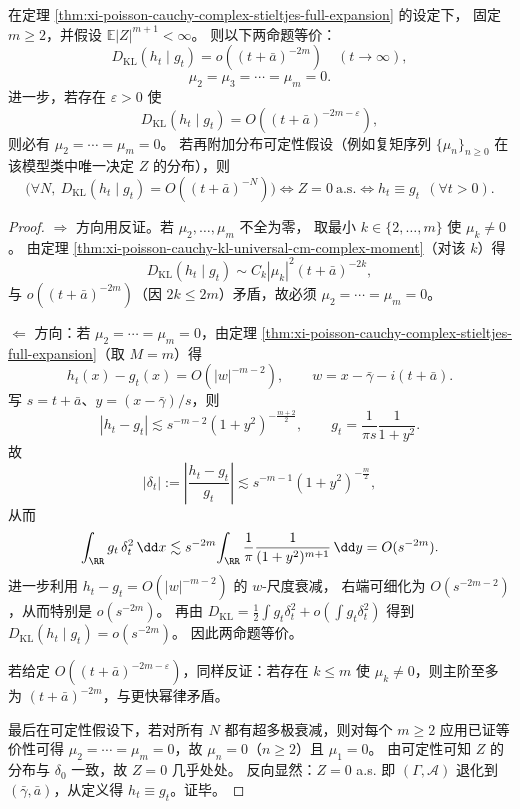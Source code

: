 \begin{theorem}[超多极衰减的分层刚性]\label{thm:xi-poisson-cauchy-supermultipole-hierarchy-rigidity}
在定理 \ref{thm:xi-poisson-cauchy-complex-stieltjes-full-expansion} 的设定下，
固定 \(m\ge 2\)，并假设 \(\mathbb E|Z|^{m+1}<\infty\)。
则以下两命题等价：
\[
D_{\mathrm{KL}}(h_t\mid g_t)=o((t+\bar a)^{-2m})\quad(t\to\infty),
\]
\[
\mu_2=\mu_3=\cdots=\mu_m=0.
\]
进一步，若存在 \(\varepsilon>0\) 使
\[
D_{\mathrm{KL}}(h_t\mid g_t)=O((t+\bar a)^{-2m-\varepsilon}),
\]
则必有 \(\mu_2=\cdots=\mu_m=0\)。
若再附加分布可定性假设（例如复矩序列 \(\{\mu_n\}_{n\ge0}\) 在该模型类中唯一决定 \(Z\) 的分布），则
\[
\bigl(\forall N,\ D_{\mathrm{KL}}(h_t\mid g_t)=O((t+\bar a)^{-N})\bigr)
\iff Z=0\ \text{a.s.}
\iff h_t\equiv g_t\ \ (\forall t>0).
\]
\end{theorem}
\begin{proof}
\(\Rightarrow\) 方向用反证。若 \(\mu_2,\dots,\mu_m\) 不全为零，
取最小 \(k\in\{2,\dots,m\}\) 使 \(\mu_k\neq 0\)。
由定理 \ref{thm:xi-poisson-cauchy-kl-universal-cm-complex-moment}（对该 \(k\)）得
\[
D_{\mathrm{KL}}(h_t\mid g_t)\sim C_k|\mu_k|^2(t+\bar a)^{-2k},
\]
与 \(o((t+\bar a)^{-2m})\)（因 \(2k\le 2m\)）矛盾，故必须 \(\mu_2=\cdots=\mu_m=0\)。
\par
\(\Leftarrow\) 方向：若 \(\mu_2=\cdots=\mu_m=0\)，由定理
\ref{thm:xi-poisson-cauchy-complex-stieltjes-full-expansion}（取 \(M=m\)）得
\[
h_t(x)-g_t(x)=O\!\left(|w|^{-m-2}\right),
\qquad
w=x-\bar\gamma-i(t+\bar a).
\]
写 \(s=t+\bar a\)、\(y=(x-\bar\gamma)/s\)，则
\[
|h_t-g_t|
\lesssim s^{-m-2}(1+y^2)^{-\frac{m+2}{2}},\qquad
g_t=\frac{1}{\pi s}\frac{1}{1+y^2}.
\]
故
\[
|\delta_t|:=\left|\frac{h_t-g_t}{g_t}\right|
\lesssim s^{-m-1}(1+y^2)^{-\frac m2},
\]
从而
\[
\int_{\RR}g_t\,\delta_t^2\,\dd x
\lesssim s^{-2m}\!\int_{\RR}\frac{1}{\pi}\frac{1}{(1+y^2)^{m+1}}\,\dd y
=O(s^{-2m}).
\]
进一步利用 \(h_t-g_t=O(|w|^{-m-2})\) 的 \(w\)-尺度衰减，
右端可细化为 \(O(s^{-2m-2})\)，从而特别是 \(o(s^{-2m})\)。
再由
\(
D_{\mathrm{KL}}=\frac12\int g_t\delta_t^2+o(\int g_t\delta_t^2)
\)
得到 \(D_{\mathrm{KL}}(h_t\mid g_t)=o(s^{-2m})\)。
因此两命题等价。
\par
若给定 \(O((t+\bar a)^{-2m-\varepsilon})\)，同样反证：若存在 \(k\le m\) 使 \(\mu_k\neq 0\)，则主阶至多为 \((t+\bar a)^{-2m}\)，与更快幂律矛盾。
\par
最后在可定性假设下，若对所有 \(N\) 都有超多极衰减，则对每个 \(m\ge 2\) 应用已证等价性可得
\(\mu_2=\cdots=\mu_m=0\)，故 \(\mu_n=0\)（\(n\ge 2\)）且 \(\mu_1=0\)。
由可定性可知 \(Z\) 的分布与 \(\delta_0\) 一致，故 \(Z=0\) 几乎处处。
反向显然：\(Z=0\) a.s. 即 \((\Gamma,\mathcal A)\) 退化到 \((\bar\gamma,\bar a)\)，从定义得 \(h_t\equiv g_t\)。证毕。
\end{proof}

\endinput
